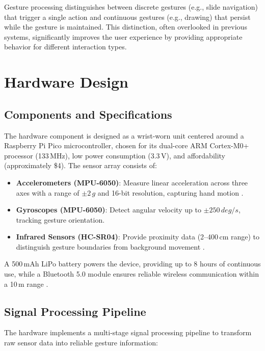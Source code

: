 \documentclass[arxiv,usenatbib]{iupartex}
\begin{document}
Gesture processing distinguishes between discrete gestures (e.g., slide navigation) that trigger a single action and continuous gestures (e.g., drawing) that persist while the gesture is maintained. This distinction, often overlooked in previous systems, significantly improves the user experience by providing appropriate behavior for different interaction types.

\section{Hardware Design}
\subsection{Components and Specifications}
The hardware component is designed as a wrist-worn unit centered around a Raspberry Pi Pico microcontroller, chosen for its dual-core ARM Cortex-M0+ processor (133\,MHz), low power consumption (3.3\,V), and affordability (approximately \$4). The sensor array consists of:
\begin{itemize}
  \item \textbf{Accelerometers (MPU-6050)}: Measure linear acceleration across three axes with a range of $\pm 2\,\si{g}$ and 16-bit resolution, capturing hand motion \cite{Kim2020}.
  \item \textbf{Gyroscopes (MPU-6050)}: Detect angular velocity up to $\pm 250\,\si{deg/s}$, tracking gesture orientation.
  \item \textbf{Infrared Sensors (HC-SR04)}: Provide proximity data (2–400\,\si{cm} range) to distinguish gesture boundaries from background movement \cite{Bai2023}.
\end{itemize}
A 500\,mAh LiPo battery powers the device, providing up to 8 hours of continuous use, while a Bluetooth 5.0 module ensures reliable wireless communication within a 10\,\si{m} range \cite{Li2023}.

\subsection{Signal Processing Pipeline}
The hardware implements a multi-stage signal processing pipeline to transform raw sensor data into reliable gesture information:
\end{document}
